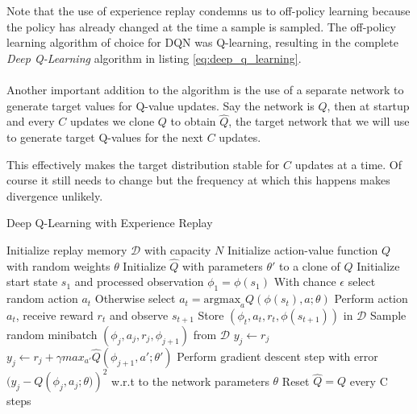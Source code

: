 Note that the use of experience replay condemns us to off-policy learning
because the policy has already changed at the time a sample is sampled.
The off-policy learning algorithm of choice for DQN
was Q-learning,
resulting in the complete \textit{Deep Q-Learning}
algorithm in listing \ref{eq:deep_q_learning}.

\paragraph{}
Another important addition to the algorithm
is the use of a separate network to generate target values
for Q-value updates.
Say the network is $Q$,
then at startup and every $C$ updates
we clone $Q$ to obtain $\hat{Q}$,
the target network that we will use to generate target Q-values
for the next $C$ updates.

This effectively makes the target distribution stable
for $C$ updates at a time.
Of course it still needs to change
but the frequency at which this happens
makes divergence unlikely.

\begin{algorithm}
  \caption{Deep Q-Learning with Experience Replay}
\label{algo:deep_q_learning}
\begin{algorithmic}
  \State Initialize replay memory $\mathcal{D}$ with capacity $N$
  \State Initialize action-value function $Q$ with random weights $\theta$
  \State Initialize $\hat{Q}$ with parameters $\theta'$ to a clone of $Q$
    \State Initialize start state $s_1$ and processed observation $\phi_1 = \phi(s_1)$
      \State With chance $\epsilon$ select random action $a_t$
      \State Otherwise select $a_t = \text{argmax}_a Q(\phi(s_t), a; \theta)$
      \State Perform action $a_t$, receive reward $r_t$ and observe $s_{t+1}$
      \State Store $(\phi_t, a_t, r_t, \phi(s_{t+1}))$ in $\mathcal{D}$
      \State Sample random minibatch $(\phi_j, a_j, r_j, \phi_{j+1})$ from $\mathcal{D}$
        \State $y_j \gets r_j$
      \Else
      \State $y_j \gets r_j + \gamma max_{a'} \hat{Q}(\phi_{j+1}, a';\theta')$
      \EndIf
      \State Perform gradient descent step with error
      $(y_j-Q\left(\phi_j,a_j;\theta)\right)^2$
      w.r.t to the network parameters $\theta$
      \State Reset $\hat{Q} = Q$ every C steps
    \EndFor
  \EndFor
\end{algorithmic}
\end{algorithm}

